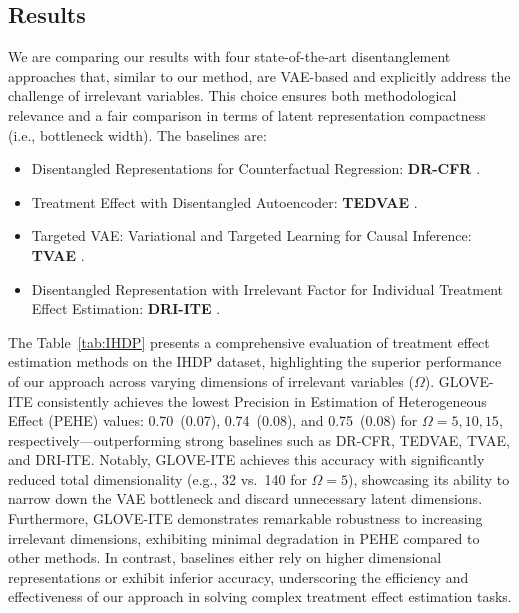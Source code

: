 \documentclass[doubleblind]{ecai}
\begin{document}
	\subsection{Results}
		
	We are comparing our results with four state-of-the-art disentanglement approaches that, similar to our method, are VAE-based and explicitly address the challenge of irrelevant variables. This choice ensures both methodological relevance and a fair comparison in terms of latent representation compactness (i.e., bottleneck width). The baselines are:  
	\begin{itemize}
		\item Disentangled Representations for Counterfactual Regression: \textbf{DR-CFR} \citep{Negar}.
		\item Treatment Effect with Disentangled Autoencoder: \textbf{TEDVAE} \citep{TEDEV}.
		\item Targeted VAE: Variational and Targeted Learning for Causal Inference: \textbf{TVAE} \citep{vowels2021targeted}.
		\item Disentangled Representation with Irrelevant Factor for Individual Treatment Effect Estimation: \textbf{DRI-ITE} \citep{Khan2024OnTE}.
	\end{itemize}
	
		
	The Table~\ref{tab:IHDP} presents a comprehensive evaluation of treatment effect estimation methods on the IHDP dataset, highlighting the superior performance of our approach across varying dimensions of irrelevant variables ($\Omega$). GLOVE-ITE consistently achieves the lowest Precision in Estimation of Heterogeneous Effect (PEHE) values: 0.70~(0.07), 0.74~(0.08), and 0.75~(0.08) for $\Omega=5,10,15$, respectively---outperforming strong baselines such as DR-CFR, TEDVAE, TVAE, and DRI-ITE. Notably, GLOVE-ITE achieves this accuracy with significantly reduced total dimensionality (e.g., 32 vs.\ 140 for $\Omega=5$), showcasing its ability to narrow down the VAE bottleneck and discard unnecessary latent dimensions. Furthermore, GLOVE-ITE demonstrates remarkable robustness to increasing irrelevant dimensions, exhibiting minimal degradation in PEHE compared to other methods. In contrast, baselines either rely on higher dimensional representations or exhibit inferior accuracy, underscoring the efficiency and effectiveness of our approach in solving complex treatment effect estimation tasks.
	
\end{document}
